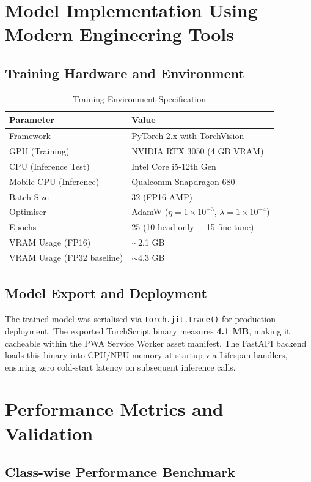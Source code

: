\documentclass[12pt,oneside]{report}
\begin{document}
\section{Model Implementation Using Modern Engineering Tools}

\subsection{Training Hardware and Environment}
\begin{table}[H]
\centering
\caption{Training Environment Specification}
\begin{tabular}{@{}ll@{}}
\toprule
\textbf{Parameter} & \textbf{Value} \\ \midrule
Framework & PyTorch 2.x with TorchVision \\
GPU (Training) & NVIDIA RTX 3050 (4 GB VRAM) \\
CPU (Inference Test) & Intel Core i5-12th Gen \\
Mobile CPU (Inference) & Qualcomm Snapdragon 680 \\
Batch Size & 32 (FP16 AMP) \\
Optimiser & AdamW ($\eta = 1\times10^{-3}$, $\lambda = 1\times10^{-4}$) \\
Epochs & 25 (10 head-only + 15 fine-tune) \\
VRAM Usage (FP16) & $\sim$2.1 GB \\
VRAM Usage (FP32 baseline) & $\sim$4.3 GB \\ \bottomrule
\end{tabular}
\end{table}

\subsection{Model Export and Deployment}
The trained model was serialised via \texttt{torch.jit.trace()} for production deployment. The exported TorchScript binary measures \textbf{4.1 MB}, making it cacheable within the PWA Service Worker asset manifest. The FastAPI backend loads this binary into CPU/NPU memory at startup via Lifespan handlers, ensuring zero cold-start latency on subsequent inference calls.

\section{Performance Metrics and Validation}

\subsection{Class-wise Performance Benchmark}
\end{document}
